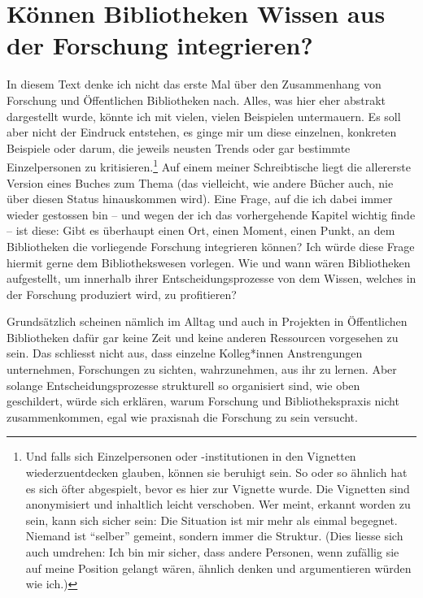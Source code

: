 \documentclass[a4paper,
fontsize=11pt,
oneside,
numbers=noperiodatend,
parskip=half-,
bibliography=totoc,
final
]{scrartcl}
\begin{document}
\hypertarget{kuxf6nnen-bibliotheken-wissen-aus-der-forschung-integrieren}{%
\section{Können Bibliotheken Wissen aus der Forschung
integrieren?}\label{kuxf6nnen-bibliotheken-wissen-aus-der-forschung-integrieren}}

In diesem Text denke ich nicht das erste Mal über den Zusammenhang von
Forschung und Öffentlichen Bibliotheken nach. Alles, was hier eher
abstrakt dargestellt wurde, könnte ich mit vielen, vielen Beispielen
untermauern. Es soll aber nicht der Eindruck entstehen, es ginge mir um
diese einzelnen, konkreten Beispiele oder darum, die jeweils neusten
Trends oder gar bestimmte Einzelpersonen zu kritisieren.\footnote{Und
  falls sich Einzelpersonen oder -institutionen in den Vignetten
  wiederzuentdecken glauben, können sie beruhigt sein. So oder so
  ähnlich hat es sich öfter abgespielt, bevor es hier zur Vignette
  wurde. Die Vignetten sind anonymisiert und inhaltlich leicht
  verschoben. Wer meint, erkannt worden zu sein, kann sich sicher sein:
  Die Situation ist mir mehr als einmal begegnet. Niemand ist
  \enquote{selber} gemeint, sondern immer die Struktur. (Dies liesse
  sich auch umdrehen: Ich bin mir sicher, dass andere Personen, wenn
  zufällig sie auf meine Position gelangt wären, ähnlich denken und
  argumentieren würden wie ich.)} Auf einem meiner Schreibtische liegt
die allererste Version eines Buches zum Thema (das vielleicht, wie
andere Bücher auch, nie über diesen Status hinauskommen wird). Eine
Frage, auf die ich dabei immer wieder gestossen bin -- und wegen der ich
das vorhergehende Kapitel wichtig finde -- ist diese: Gibt es überhaupt
einen Ort, einen Moment, einen Punkt, an dem Bibliotheken die
vorliegende Forschung integrieren können? Ich würde diese Frage hiermit
gerne dem Bibliothekswesen vorlegen. Wie und wann wären Bibliotheken
aufgestellt, um innerhalb ihrer Entscheidungsprozesse von dem Wissen,
welches in der Forschung produziert wird, zu profitieren?

Grundsätzlich scheinen nämlich im Alltag und auch in Projekten in
Öffentlichen Bibliotheken dafür gar keine Zeit und keine anderen
Ressourcen vorgesehen zu sein. Das schliesst nicht aus, dass einzelne
Kolleg*innen Anstrengungen unternehmen, Forschungen zu sichten,
wahrzunehmen, aus ihr zu lernen. Aber solange Entscheidungsprozesse
strukturell so organisiert sind, wie oben geschildert, würde sich
erklären, warum Forschung und Bibliothekspraxis nicht zusammenkommen,
egal wie praxisnah die Forschung zu sein versucht.
\end{document}
